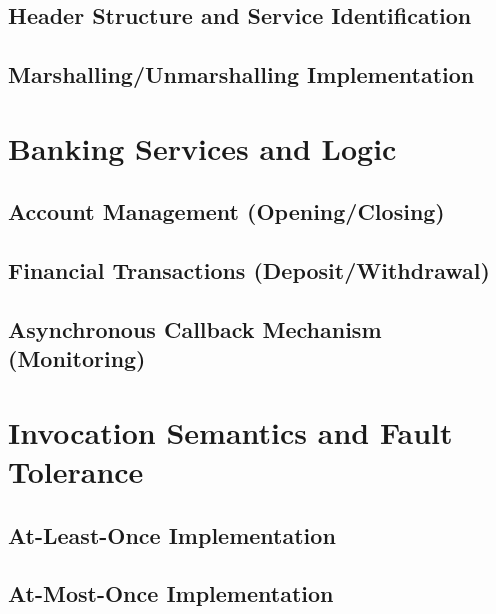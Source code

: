 \documentclass[11pt,a4paper]{article}
\begin{document}
\subsection{Header Structure and Service Identification}
\subsection{Marshalling/Unmarshalling Implementation}

\section{Banking Services and Logic}
\subsection{Account Management (Opening/Closing)}
\subsection{Financial Transactions (Deposit/Withdrawal)}
\subsection{Asynchronous Callback Mechanism (Monitoring)}

\section{Invocation Semantics and Fault Tolerance}
\subsection{At-Least-Once Implementation}
\subsection{At-Most-Once Implementation}
\end{document}
